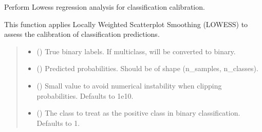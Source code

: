 \documentclass[letterpaper,10pt,english]{sphinxmanual}
\begin{document}
\begin{fulllineitems}
\label{\detokenize{calzone:calzone.metrics.lowess_regression_analysis}}
\pysigstartsignatures
{}
\pysigstopsignatures
\sphinxAtStartPar
Perform Lowess regression analysis for classification calibration.

\sphinxAtStartPar
This function applies Locally Weighted Scatterplot Smoothing (LOWESS) to assess
the calibration of classification predictions.
\begin{quote}\begin{description}
\begin{itemize}
\item {} 
\sphinxAtStartPar
{} () \textendash{} True binary labels. If multi\sphinxhyphen{}class, will be converted to binary.

\item {} 
\sphinxAtStartPar
{} () \textendash{} Predicted probabilities. Should be of shape (n\_samples, n\_classes).

\item {} 
\sphinxAtStartPar
{} (\sphinxstyleliteralemphasis{\sphinxupquote{, }}) \textendash{} Small value to avoid numerical instability when clipping probabilities. Defaults to 1e\sphinxhyphen{}10.

\item {} 
\sphinxAtStartPar
{} (\sphinxstyleliteralemphasis{\sphinxupquote{, }}) \textendash{} The class to treat as the positive class in binary classification. Defaults to 1.


\end{itemize}
\end{description}
\end{quote}
\end{fulllineitems}
\end{document}
